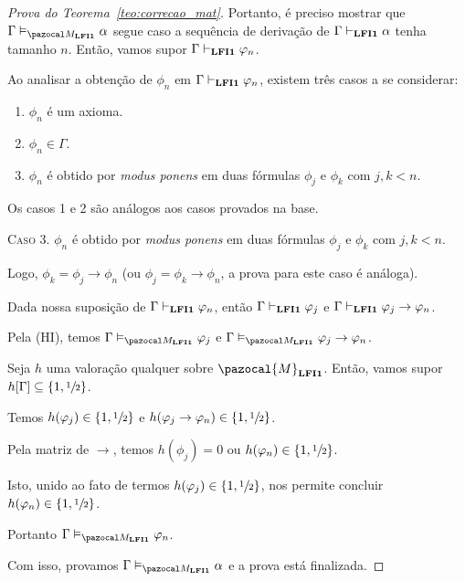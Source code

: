 \begin{proof}[Prova do Teorema~\ref{teo:correcao_mat}]
         Portanto, é preciso mostrar que $\Gamma \conmat \alpha$ segue caso a sequência de derivação de $\Gamma \vdash_{{\normalfont\textbf{LFI1}}{}} \alpha$ tenha tamanho $n$. Então, vamos supor $\Gamma \vdash_{{\normalfont\textbf{LFI1}}{}} \varphi_{n}$.
         
         Ao analisar a obtenção de $\phi_{n}$ em $\Gamma \vdash_{{\normalfont\textbf{LFI1}}{}} \varphi_{n}$, existem três casos a se considerar:
         
         \begin{enumerate}
            \item $\phi_{n}$ é um axioma.
            \item $\phi_{n} \in \Gamma$.
            \item $\phi_{n}$ é obtido por \textit{modus ponens} em duas fórmulas $\phi_{j}$ e $\phi_{k}$ com $j, k < n$. 
         \end{enumerate}
         
         Os casos 1 e 2 são análogos aos casos provados na base.
         
         \noindent \textsc{Caso 3.} $\phi_{n}$ é obtido por \textit{modus ponens} em duas fórmulas $\phi_{j}$ e $\phi_{k}$ com $j, k < n$. 
         
         Logo, $\phi_{k} = \phi_{j} \to \phi_{n}$ (ou $\phi_{j} = \phi_{k} \to \phi_{n}$, a prova para este caso é análoga). 
         
         Dada nossa suposição de $\Gamma \vdash_{{\normalfont\textbf{LFI1}}{}} \varphi_{n}$, então $\Gamma \vdash_{{\normalfont\textbf{LFI1}}{}} \varphi_{j}$ e $\Gamma \vdash_{{\normalfont\textbf{LFI1}}{}} \varphi_{j} \to \varphi_{n}$. 
         
         Pela (HI), temos $\Gamma \conmat \phi_{j}$ e $\Gamma \conmat \phi_{j} \to \phi_{n}$.

         Seja $h$ uma valoração qualquer sobre $\pazocal{M}_{\lfium{}}$. Então, vamos supor $h[\Gamma] \subseteq \{1, \sfrac{1}{2}{}\}$. 
         
         Temos $h(\varphi_{j}) \in \{1, \sfrac{1}{2}{}\}$ e $h(\varphi_{j} \to \varphi_{n}) \in \{1,\sfrac{1}{2}{}\}$. 
         
         Pela matriz de $\to$, temos $h(\phi_{j}) = 0$ ou $h(\varphi_{n}) \in \{1,\sfrac{1}{2}{}\}$. 
         
         Isto, unido ao fato de termos $h(\varphi_{j}) \in \{1,\sfrac{1}{2}{}\}$, nos permite concluir $h(\varphi_{n}) \in \{1,\sfrac{1}{2}{}\}$. 
         
         Portanto $\Gamma \conmat \phi_{n}$.

         \noindent Com isso, provamos $\Gamma \conmat \alpha$ e a prova está finalizada.

    \end{proof}

